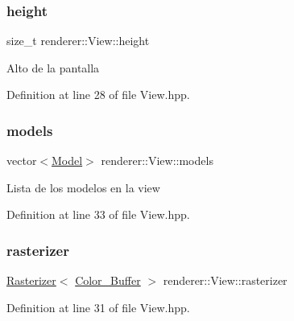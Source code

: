 \mbox{\label{classrenderer_1_1_view_a7fa20c6d863431bb46aed44686231b4b}} 
\subsubsection{\texorpdfstring{height}{height}}
{\footnotesize\ttfamily size\+\_\+t renderer\+::\+View\+::height\hspace{0.3cm}{\ttfamily [private]}}

Alto de la pantalla 

Definition at line 28 of file View.\+hpp.

\mbox{\label{classrenderer_1_1_view_aa997e17a7f47acd5ead168a146233e4d}} 
\subsubsection{\texorpdfstring{models}{models}}
{\footnotesize\ttfamily vector$<$\mbox{\hyperlink{classrenderer_1_1_model}{Model}}$>$ renderer\+::\+View\+::models\hspace{0.3cm}{\ttfamily [private]}}

Lista de los modelos en la view 

Definition at line 33 of file View.\+hpp.

\mbox{\label{classrenderer_1_1_view_a77c9d19b0b18eafd4a4528c1d0115b7d}} 
\subsubsection{\texorpdfstring{rasterizer}{rasterizer}}
{\footnotesize\ttfamily \mbox{\hyperlink{classrenderer_1_1_rasterizer}{Rasterizer}}$<$ \mbox{\hyperlink{classrenderer_1_1_view_a21ded0a0afb4aea559b74d004cee798f}{Color\+\_\+\+Buffer}} $>$ renderer\+::\+View\+::rasterizer\hspace{0.3cm}{\ttfamily [private]}}



Definition at line 31 of file View.\+hpp.

\mbox{\label{classrenderer_1_1_view_a5632e677221be9cb1120c432acb40893}} 
